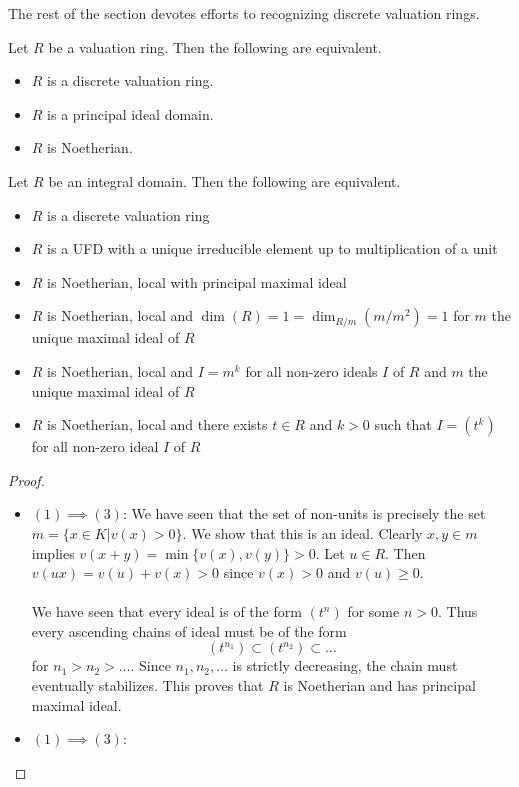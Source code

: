 \documentclass[a4paper]{article}
\begin{document}
The rest of the section devotes efforts to recognizing discrete valuation rings. 

\begin{prp}{}{} Let $R$ be a valuation ring. Then the following are equivalent. 
\begin{itemize}
\item $R$ is a discrete valuation ring. 
\item $R$ is a principal ideal domain. 
\item $R$ is Noetherian. 
\end{itemize}
\end{prp}

\begin{prp}{}{} Let $R$ be an integral domain. Then the following are equivalent. 
\begin{itemize}
\item $R$ is a discrete valuation ring
\item $R$ is a UFD with a unique irreducible element up to multiplication of a unit
\item $R$ is Noetherian, local with principal maximal ideal
\item $R$ is Noetherian, local and $\dim(R)=1=\dim_{R/m}(m/m^2)=1$ for $m$ the unique maximal ideal of $R$
\item $R$ is Noetherian, local and $I=m^k$ for all non-zero ideals $I$ of $R$ and $m$ the unique maximal ideal of $R$
\item $R$ is Noetherian, local and there exists $t\in R$ and $k>0$ such that $I=(t^k)$ for all non-zero ideal $I$ of $R$
\end{itemize} \tcbline
\begin{proof}~\\
\begin{itemize}
\item $(1)\implies(3)$: We have seen that the set of non-units is precisely the set $m=\{x\in K|v(x)>0\}$. We show that this is an ideal. Clearly $x,y\in m$ implies $v(x+y)=\min\{v(x),v(y)\}>0$. Let $u\in R$. Then $v(ux)=v(u)+v(x)>0$ since $v(x)>0$ and $v(u)\geq 0$. \\~\\
We have seen that every ideal is of the form $(t^n)$ for some $n>0$. Thus every ascending chains of ideal must be of the form $$(t^{n_1})\subset(t^{n_2})\subset\dots$$ for $n_1>n_2>\dots$. Since $n_1,n_2,\dots$ is strictly decreasing, the chain must eventually stabilizes. This proves that $R$ is Noetherian and has principal maximal ideal. 
\item $(1)\implies(3)$:
\end{itemize}
\end{proof}
\end{prp}
\end{document}
